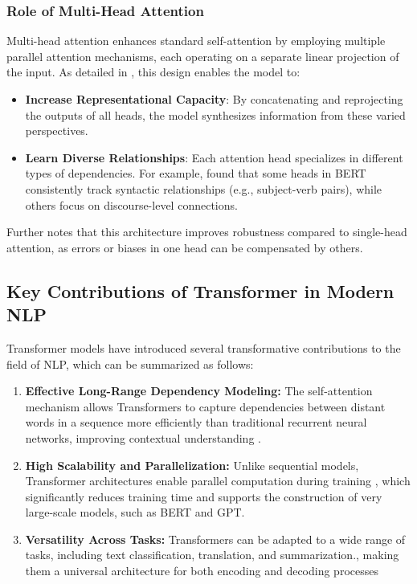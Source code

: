 \subsubsection{Role of Multi-Head Attention}
Multi-head attention enhances standard self-attention by employing multiple parallel attention mechanisms, each operating on a separate linear projection of the input. As detailed in \citep{rothman2021transformers}, this design enables the model to:

\begin{itemize}
	\item \textbf{Increase Representational Capacity}: By concatenating and reprojecting the outputs of all heads, the model synthesizes information from these varied perspectives. 
	
	\item \textbf{Learn Diverse Relationships}: Each attention head specializes in different types of dependencies. For example, \citep{clark2019what} found that some heads in BERT consistently track syntactic relationships (e.g., subject-verb pairs), while others focus on discourse-level connections.
	

\end{itemize}

Further notes that this architecture improves robustness compared to single-head attention, as errors or biases in one head can be compensated by others.

\subsection{Key Contributions of Transformer in Modern NLP}

Transformer models have introduced several transformative contributions to the field of NLP, which can be summarized as follows:

\begin{enumerate}
	\item \textbf{Effective Long-Range Dependency Modeling:} The self-attention mechanism allows Transformers to capture dependencies between distant words in a sequence more efficiently than traditional recurrent neural networks\citep{vaswani2017attention}, improving contextual understanding .
	
	\item \textbf{High Scalability and Parallelization:} Unlike sequential models, Transformer architectures enable parallel computation during training \citep{devlin2018bert}, which significantly reduces training time and supports the construction of very large-scale models, such as BERT and GPT.
	
	\item \textbf{Versatility Across Tasks:} Transformers can be adapted to a wide range of tasks, including text classification, translation, and summarization\citep{radford2019language}., making them a universal architecture for both encoding and decoding processes 
\end{enumerate}


